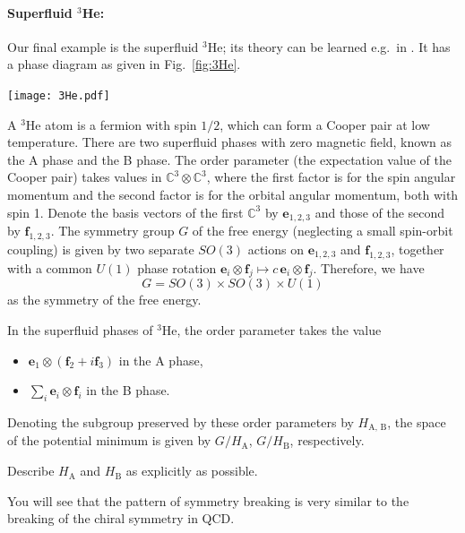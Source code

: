 \documentclass[12pt]{article}
\numberwithin{equation}{section}
\numberwithin{figure}{section}
\theoremstyle{remark}
\renewenvironment{figure}[1][]{
  \begin{originalfigure}[#1]
    \begin{mdframed}[linecolor=black!0,backgroundcolor=black!1]
}{
    \end{mdframed}
  \end{originalfigure}
}
\def\bC{\mathbb{C}}
\begin{document}
\paragraph{Superfluid $^3$He:}
Our final example is the superfluid $^3$He;
its theory can be learned e.g.~in \cite{SuperfluidHe3Textbook,VolovikBook}.
It has a phase diagram as given in Fig.~\ref{fig:3He}.
\begin{figure}[h]
\centering
    \texttt{[image: 3He.pdf]}
    \caption{Phase diagram of $^3$He (taken from \cite[Fig.7.1]{VolovikBook}).}
    \label{fig:3He}
\end{figure}
A $^3$He atom is a fermion with spin $1/2$, which can form a Cooper pair at low temperature.
There are two superfluid phases with zero magnetic field, known as the A phase and the B phase.
The order parameter (the expectation value of the Cooper pair) takes values in
$\bC^3\otimes \bC^3$,
where the first factor is for the spin angular momentum
and the second factor is for the orbital angular momentum,
both with spin 1.
Denote the basis vectors of the first $\bC^3$ by $\mathbf{e}_{1,2,3}$
and those of the second by $\mathbf{f}_{1,2,3}$.
The symmetry group $G$ of the free energy (neglecting a small spin-orbit coupling) is given by two separate $SO(3)$ actions on 
$\mathbf{e}_{1,2,3}$ and $\mathbf{f}_{1,2,3}$,
together with a common $U(1)$ phase rotation $\mathbf{e}_i \otimes \mathbf{f}_j \mapsto c\, \mathbf{e}_i \otimes \mathbf{f}_j$.
Therefore, we have \begin{equation}
  G = SO(3)\times SO(3)\times U(1)
\end{equation}
as the symmetry of the free energy.
\begin{example}
\label{ex:helium3}
In the superfluid phases of $^3$He, the order parameter takes the value
\begin{itemize}
\item $\mathbf{e}_1 \otimes (\mathbf{f}_2+ i\mathbf{f}_3)$ in the A phase,
\item $\sum_i \mathbf{e}_i \otimes \mathbf{f}_i$ in the B phase.
\end{itemize}
Denoting the subgroup preserved by these order parameters by $H_\text{A,  B}$,
the space of the potential minimum is given by $G/H_\text{A}$, $G/H_\text{B}$, respectively.
\end{example}

\begin{question}
Describe $H_\text{A}$ and $H_\text{B}$ as explicitly as possible.
\end{question}
You will see that the pattern of symmetry breaking is very similar to the 
breaking of the chiral symmetry in QCD.
\end{document}
